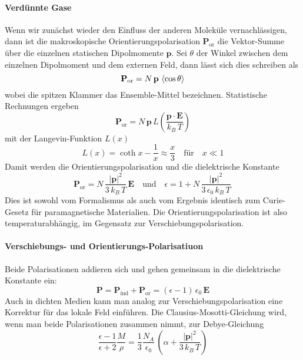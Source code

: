 \paragraph{Verdünnte Gase} Wenn wir zunächst wieder den Einfluss der anderen Moleküle vernachlässigen, dann ist die makroskopische Orientierungspolarisation $\mathbf{P}_\text{or}$ die Vektor-Summe über die einzelnen statischen Dipolmomente $ \mathbf{p}$. Sei $\theta$ der Winkel zwischen dem einzelnen Dipolmoment und dem externen Feld, dann lässt sich dies schreiben als
\begin{equation}
\mathbf{P}_\text{or} = N \, \mathbf{p} \, \braket{ \cos \theta}
\end{equation}
wobei die spitzen Klammer das Ensemble-Mittel bezeichnen. Statistische Rechnungen ergeben
 \begin{equation}
\mathbf{P}_\text{or} = N \, \mathbf{p} \, L \left( \frac{\mathbf{p} \cdot \mathbf{E}}{k_B \, T} \right)
\end{equation}
mit der Langevin-Funktion $L(x)$
\begin{equation}
L(x) = \coth x - \frac{1}{x} \approx \frac{x}{3} \quad \text{für} \quad x \ll 1
\end{equation}
Damit werden die Orientierungspolarisation und die dielektrische Konstante
\begin{equation}
\mathbf{P}_\text{or} = N \, \frac{|\mathbf{p} |^2}{3 \, k_B \, T} \, \mathbf{E}  \quad \text{und} \quad \epsilon = 1 + N \, \frac{|\mathbf{p} |^2}{3\, \epsilon_0 \, k_B \, T} \,
\end{equation}
Dies ist sowohl vom Formalismus als auch vom Ergebnis identisch zum Curie-Gesetz für paramagnetische Materialien. Die Orientierungspolarisation ist also temperaturabhängig, im Gegensatz zur Verschiebungspolarisation.

\paragraph{Verschiebungs- und Orientierungs-Polarisatiuon} Beide Polarisationen addieren sich und gehen gemeinsam in die dielektrische Konstante ein:
\begin{equation}
\mathbf{P}  = \mathbf{P}_\text{ind} + \mathbf{P}_\text{or} = \left( \epsilon - 1 \right) \, \epsilon_0 \, \mathbf{E}
\end{equation}
Auch in dichten Medien kann man analog zur Verschiebungspolarisation eine Korrektur für das lokale Feld einführen. Die Clausius-Mosotti-Gleichung wird, wenn man beide Polarisationen zusammen nimmt, zur Debye-Gleichung
 \begin{equation}
 \frac{\epsilon - 1}{\epsilon + 2} \frac{M}{\rho} = \frac{1}{3} \frac{N_A}{\epsilon
_0} \,  \left( \alpha  + \frac{|\mathbf{p} |^2}{3 \, k_B \, T}  \right)
 \end{equation}
 
